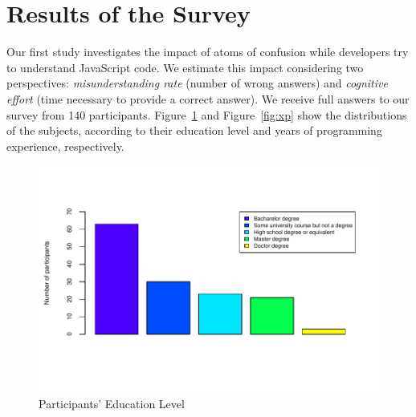 

\section{Results of the Survey}
\label{sec:survey-resuts} 

Our first study investigates the impact of atoms of confusion while developers try to understand JavaScript code.
We estimate this impact considering two perspectives: \emph{misunderstanding rate} (number of wrong answers)
and \emph{cognitive effort} (time necessary to provide a correct answer). We receive full answers to our survey
from 140 participants. Figure~\ref{fig:degree} and Figure~\ref{fig:xp} show the distributions of the subjects,
according to their education level and years of programming experience, respectively.

\begin{figure}[htb]
      \centering
      \includegraphics[width=\columnwidth]{images/dem-education-1.pdf}
      \caption{Participants' Education Level}\label{fig:degree}
  \end{figure}
  
